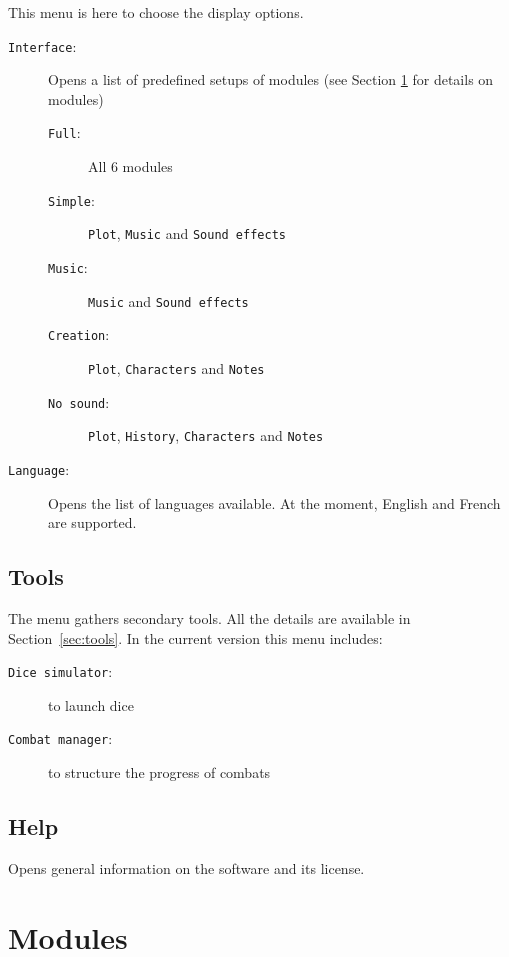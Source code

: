 \documentclass[a4paper,12pt]{article}
\newcommand*{\interfaceitem}[1]{\texttt{#1}}
\begin{document}
This menu is here to choose the display options.
\begin{description}
    \item[\interfaceitem{Interface}:]{Opens a list of predefined setups of modules (see Section \ref{sec:modules} for details on modules)
        \begin{description}
            \item[\interfaceitem{Full}:]{All 6 modules}
            \item[\interfaceitem{Simple}:]{\interfaceitem{Plot}, \interfaceitem{Music} and \interfaceitem{Sound effects}}
            \item[\interfaceitem{Music}:]{\interfaceitem{Music} and \interfaceitem{Sound effects}}
            \item[\interfaceitem{Creation}:]{\interfaceitem{Plot}, \interfaceitem{Characters} and \interfaceitem{Notes}}
            \item[\interfaceitem{No sound}:]{\interfaceitem{Plot}, \interfaceitem{History}, \interfaceitem{Characters} and \interfaceitem{Notes}}
        \end{description}
    }
\item[\interfaceitem{Language}:]{Opens the list of languages available. At the moment, English and French are supported.}
\end{description}

\subsection{Tools}
\label{sec:menu_tools}

The menu gathers secondary tools. All the details are available in Section~\ref{sec:tools}. In the current version this menu includes:
\begin{description}
    \item[\interfaceitem{Dice simulator}:]{to launch dice}
    \item[\interfaceitem{Combat manager}:]{to structure the progress of combats}
\end{description}

\subsection{Help}
\label{sec:help}

Opens general information on the software and its license.

\section{Modules}
\label{sec:modules}
\end{document}
